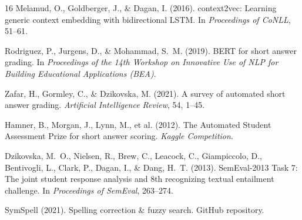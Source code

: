 \documentclass[11pt,a4paper]{article}
\begin{document}
\begin{thebibliography}{16}
Melamud, O., Goldberger, J., \& Dagan, I. (2016).
context2vec: Learning generic context embedding with bidirectional LSTM.
In \emph{Proceedings of CoNLL}, 51--61.

Rodriguez, P., Jurgens, D., \& Mohammad, S.~M. (2019).
BERT for short answer grading.
In \emph{Proceedings of the 14th Workshop on Innovative Use of NLP for Building Educational Applications (BEA)}.

Zafar, H., Gormley, C., \& Dzikovska, M. (2021).
A survey of automated short answer grading.
\emph{Artificial Intelligence Review}, 54, 1--45.

Hamner, B., Morgan, J., Lynn, M., et al. (2012).
The Automated Student Assessment Prize for short answer scoring.
\emph{Kaggle Competition}.

Dzikovska, M.~O., Nielsen, R., Brew, C., Leacock, C., Giampiccolo, D., Bentivogli, L., Clark, P., Dagan, I., \& Dang, H.~T. (2013).
SemEval-2013 Task 7: The joint student response analysis and 8th recognizing textual entailment challenge.
In \emph{Proceedings of SemEval}, 263--274.

SymSpell (2021).
Spelling correction \& fuzzy search.
GitHub repository.

\end{thebibliography}
\end{document}
